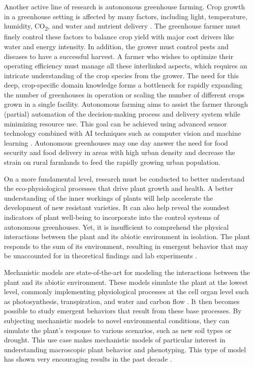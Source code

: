 Another active line of research is autonomous greenhouse farming.
Crop growth in a greenhouse setting is affected by many factors, including light, temperature, humidity, CO\textsubscript{2}, and water and nutrient delivery \citep{hemming_why_nodate}.
The greenhouse farmer must finely control these factors to balance crop yield with major cost drivers like water and energy intensity.
In addition, the grower must control pests and diseases to have a successful harvest.
A farmer who wishes to optimize their operating efficiency must manage all these interlinked aspects, which requires an intricate understanding of the crop species from the grower.
The need for this deep, crop-specific domain knowledge forms a bottleneck for rapidly expanding the number of greenhouses in operation or scaling the number of different crops grown in a single facility.
Autonomous farming aims to assist the farmer through (partial) automation of the decision-making process and delivery system while minimizing resource use.
This goal can be achieved using advanced sensor technology combined with AI techniques such as computer vision and machine learning \citep{hemming_why_nodate}.
Autonomous greenhouses may one day answer the need for food security and food delivery in areas with high urban density and decrease the strain on rural farmlands to feed the rapidly growing urban population.


On a more fundamental level, research must be conducted to better understand the eco-physiological processes that drive plant growth and health.
A better understanding of the inner workings of plants will help accelerate the development of new resistant varieties.
It can also help reveal the soundest indicators of plant well-being to incorporate into the control systems of autonomous greenhouses.
Yet, it is insufficient to comprehend the physical interactions between the plant and its abiotic environment in isolation.
The plant responds to the sum of its environment, resulting in emergent behavior that may be unaccounted for in theoretical findings and lab experiments \citep{poorter_pampered_2016}.


Mechanistic models are state-of-the-art for modeling the interactions between the plant and its abiotic environment. 
These models simulate the plant at the lowest level, commonly implementing physiological processes at the cell organ level such as photosynthesis, transpiration, and water and carbon flow \citep{coussement_turgor-driven_2020}.
It then becomes possible to study emergent behaviors that result from these base processes.
By subjecting mechanistic models to novel environmental conditions, they can simulate the plant's response to various scenarios, such as new soil types or drought.
This use case makes mechanistic models of particular interest in understanding macroscopic plant behavior and phenotyping.
This type of model has shown very encouraging results in the past decade \citep{louarn_two_2020}.


